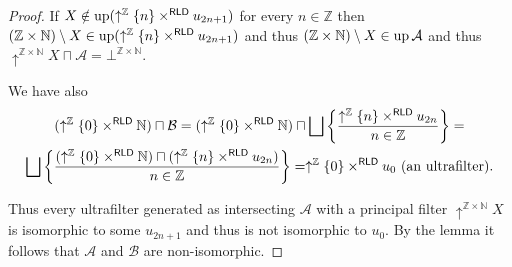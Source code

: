 \begin{proof}
If $X\notin\operatorname{up}(\uparrow^{\mathbb{Z}}\{n\}\times^{\mathsf{RLD}}u_{2n+1})$
for every $n\in\mathbb{Z}$ then $(\mathbb{Z}\times\mathbb{N})\setminus X\in\operatorname{up}(\uparrow^{\mathbb{Z}}\{n\}\times^{\mathsf{RLD}}u_{2n+1})$
and thus $(\mathbb{Z}\times\mathbb{N})\setminus X\in\operatorname{up}\mathcal{A}$
and thus $\uparrow^{\mathbb{Z}\times\mathbb{N}}X\sqcap\mathcal{A}=\bot^{\mathbb{Z}\times\mathbb{N}}$.

We have also
\begin{multline*}
(\uparrow^{\mathbb{Z}}\{0\}\times^{\mathsf{RLD}}\mathbb{N})\sqcap\mathcal{B}=(\uparrow^{\mathbb{Z}}\{0\}\times^{\mathsf{RLD}}\mathbb{N})\sqcap\bigsqcup\left\{ \frac{\uparrow^{\mathbb{Z}}\{n\}\times^{\mathsf{RLD}} u_{2n}}{n\in\mathbb{Z}}\right\}=\\
\bigsqcup\left\{ \frac{(\uparrow^{\mathbb{Z}}\{0\}\times^{\mathsf{RLD}}\mathbb{N})\sqcap(\uparrow^{\mathbb{Z}}\{n\}\times^{\mathsf{RLD}} u_{2n})}{n\in\mathbb{Z}}\right\}=\uparrow^{\mathbb{Z}}\{0\}\times^{\mathsf{RLD}}u_{0}\text{ (an ultrafilter).}
\end{multline*}


Thus every ultrafilter generated as intersecting $\mathcal{A}$ with
a principal filter $\uparrow^{\mathbb{Z}\times\mathbb{N}}X$ is isomorphic
to some $u_{2n+1}$ and thus is not isomorphic to $u_{0}$. By the
lemma it follows that $\mathcal{A}$ and $\mathcal{B}$ are non-isomorphic.
\end{proof}

